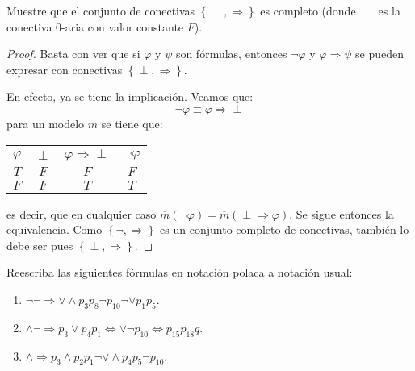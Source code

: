 \documentclass[12pt]{report}
\theoremstyle{largebreak}
\begin{document}
    \begin{excer}
        Muestre que el conjunto de conectivas $\left\{\perp,\Rightarrow \right\}$ es completo (donde $\perp$ es la conectiva $0$-aria con valor constante $F$).
    \end{excer}

    \begin{proof}
        Basta con ver que si $\varphi$ y $\psi$ son fórmulas, entonces $\neg\varphi$ y $\varphi\Rightarrow\psi$ se pueden expresar con conectivas $\left\{\perp,\Rightarrow \right\}$.

        En efecto, ya se tiene la implicación. Veamos que:
        \begin{equation*}
            \neg\varphi \equiv \varphi\Rightarrow\perp
        \end{equation*}
        para un modelo $m$ se tiene que:
        \begin{center}
            \begin{tabular}{ c | c | c | c}
                $\varphi$ & $\perp$ & $\varphi\Rightarrow\perp$ & $\neg\varphi$\\
                \hline
                $T$ & $F$ & $F$ & $F$ \\
                $F$ & $F$ & $T$ & $T$ \\
            \end{tabular}
        \end{center}
        es decir, que en cualquier caso $\overline{m}(\neg\varphi)=\overline{m}(\perp\Rightarrow\varphi)$. Se sigue entonces la equivalencia. Como $\left\{\neg,\Rightarrow \right\}$ es un conjunto completo de conectivas, también lo debe ser pues $\left\{\perp,\Rightarrow \right\}$.
    \end{proof}

    \renewcommand{\theenumi}{\alph{enumi})}

    \begin{excer}
        Reescriba las siguientes fórmulas en notación polaca a notación usual:
        \begin{enumerate}
            \item $\neg\neg\Rightarrow\lor\land p_3p_8\neg p_{10}\neg\lor p_1p_5$.
            \item $\land\neg\Rightarrow p_3\lor p_4p_1\iff\lor\neg p_{10}\iff p_{ 15}p_{18}q$.
            \item $\land\Rightarrow p_3\land p_2p_1\neg\lor\land p_4p_5\neg p_{10}$.
        \end{enumerate}
    \end{excer}
\end{document}
